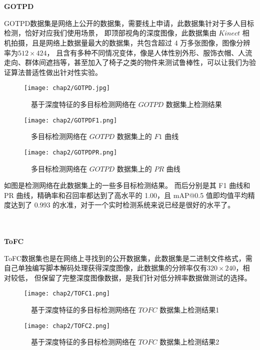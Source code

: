 \\ \hspace*{\fill} \\
\textbf{GOTPD}

GOTPD数据集是网络上公开的数据集，需要线上申请，此数据集针对于多人目标检测，恰好对应我们使用场景，
即顶部视角的深度图像，此数据集由 $Kinect$ 相机拍摄，且是网络上数据量最大的数据集，共包含超过 4 万多张图像，图像分辨率为$512\times 424$，
且含有多种不同情况变体，像是人体性别外形、服饰衣帽、人流走向、群体间遮挡等，甚至加入了椅子之类的物件来测试鲁棒性，可以让我们为验证算法普适性做出针对性实验。
\vspace{6mm}
\begin{figure}[h]
	\centering
	\texttt{[image: chap2/GOTPD.jpg]}
	\caption{\ \ 基于深度特征的多目标检测网络在 $GOTPD$ 数据集上检测结果}
	\label{fig2-7}
\end{figure}
\vspace{3mm}

\begin{figure}[htbp]
	\begin{minipage}{0.48\linewidth}
		\centering
		\texttt{[image: chap2/GOTPDF1.png]}
		\caption{\ \ 多目标检测网络在 $GOTPD$ 数据集上的 $F1$ 曲线}
		\label{fig2-8}%
	\end{minipage}
	\begin{minipage}{0.48\linewidth}
		\centering
		\texttt{[image: chap2/GOTPDPR.png]}
		\caption{\ \ 多目标检测网络在 $GOTPD$ 数据集上的 $PR$ 曲线}
		\label{fig2-9}%
	\end{minipage}
\end{figure}

如图是检测网络在此数据集上的一些多目标检测结果。
而后分别是其 F1 曲线和 PR 曲线，精确率和召回率都达到了高水平的 1.00，且 mAP@0.5 值即均值平均精度达到了 0.993 的水准，对于一个实时检测系统来说已经是很好的水平了。

\\ \hspace*{\fill} \\
\textbf{ToFC}
	
ToFC数据集也是在网络上寻找到的公开数据集，此数据集是二进制文件格式，需自己单独编写脚本解码处理获得深度图像，此数据集的分辨率仅有$320\times 240$，相对较低，
但保留了完整深度图像数据，是我们针对低分辨率数据做测试的选择。
\vspace{6mm}
\begin{figure}[htbp]
	\centering
	\begin{minipage}{0.48\linewidth}
		\centering
		\texttt{[image: chap2/TOFC1.png]}
		\caption{\ \ 基于深度特征的多目标检测网络在 $TOFC$ 数据集上检测结果1}
		\label{fig2-10}%
	\end{minipage}
	\begin{minipage}{0.48\linewidth}
		\centering
		\texttt{[image: chap2/TOFC2.png]}
		\caption{\ \ 基于深度特征的多目标检测网络在 $TOFC$ 数据集上检测结果2}
		\label{fig2-11}%
	\end{minipage}
\end{figure}

